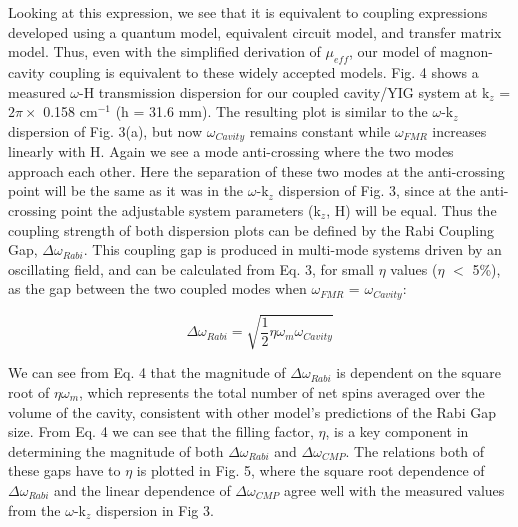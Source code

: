 \documentclass[prb,twocolumn,showpacs,preprintnumbers,amsmath,amssymb]{revtex4-1}
\begin{document}
Looking at this expression, we see that it is equivalent to coupling expressions developed using a quantum model\cite{A,C,F}, equivalent circuit model\cite{F,P,R}, and transfer matrix model\cite{G}. Thus, even with the simplified derivation of $\mu_{eff}$, our model of magnon-cavity coupling is equivalent to these widely accepted models. Fig. 4 shows a measured $\omega$-H transmission dispersion for our coupled cavity/YIG system at k$_{z}$ = $2\pi\times$ 0.158 cm$^{-1}$ (h = 31.6 mm). The resulting plot is similar to the $\omega$-k$_{z}$ dispersion of Fig. 3(a), but now $\omega_{Cavity}$ remains constant while $\omega_{FMR}$ increases linearly with H. Again we see a mode anti-crossing where the two modes approach each other. Here the separation of these two modes at the anti-crossing point will be the same as it was in the $\omega$-k$_{z}$ dispersion of Fig. 3, since at the anti-crossing point the adjustable system parameters (k$_{z}$, H) will be equal. Thus the coupling strength of both dispersion plots can be defined by the Rabi Coupling Gap, $\Delta\omega_{Rabi}$. This coupling gap is produced in multi-mode systems driven by an oscillating field\cite{U}, and can be calculated from Eq. 3, for small $\eta$ values ($\eta$ $<$ 5\%)\cite{N}, as the gap between the two coupled modes when $\omega_{FMR}$ = $\omega_{Cavity}$:

\begin{equation}
\Delta\omega_{Rabi}=\sqrt{\frac{1}{2}\eta\omega_{m}\omega_{Cavity}}
\end{equation}

We can see from Eq. 4 that the magnitude of $\Delta\omega_{Rabi}$ is dependent on the square root of $\eta\omega_{m}$, which represents the total number of net spins averaged over the volume of the cavity, consistent with other model's predictions of the Rabi Gap size. From Eq. 4 we can see that the filling factor, $\eta$, is a key component in determining the magnitude of both $\Delta\omega_{Rabi}$ and $\Delta\omega_{CMP}$. The relations both of these gaps have to $\eta$ is plotted in Fig. 5, where the square root dependence of $\Delta\omega_{Rabi}$ and the linear dependence of $\Delta\omega_{CMP}$ agree well with the measured values from the $\omega$-k$_{z}$ dispersion in Fig 3.
\end{document}
